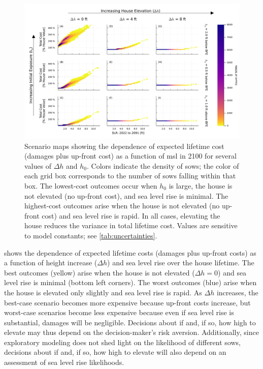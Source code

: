 \documentclass[12pt]{article}
\begin{document}
\begin{figure}
    \includegraphics[width=\textwidth]{scenario-map-slr-cost}
    \caption{
        Scenario maps showing the dependence of expected lifetime cost (damages plus up-front cost) as a function of \gls{msl} in 2100 for several values of $\Delta h$ and $h_0$.
        Colors indicate the density of \glspl{sow}; the color of each grid box corresponds to the number of \glspl{sow} falling within that box.
        The lowest-cost outcomes occur when $h_0$ is large, the house is not elevated (no up-front cost), and sea level rise is minimal.
        The highest-cost outcomes arise when the house is not elevated (no up-front cost) and sea level rise is rapid.
        In all cases, elevating the house reduces the variance in total lifetime cost.
        Values are sensitive to model constants; see \cref{tab:uncertainties}.
    }\label{fig:scenario-map-slr-cost}
\end{figure}

 shows the dependence of expected lifetime costs (damages plus up-front costs) as a function of height increase ($\Delta h$) and sea level rise over the house lifetime.
The best outcomes (yellow) arise when the house is not elevated ($\Delta h = 0$) and sea level rise is minimal (bottom left corners).
The worst outcomes (blue) arise when the house is elevated only slightly and sea level rise is rapid.
As $\Delta h$ increases, the best-case scenario becomes more expensive because up-front costs increase, but worst-case scenarios become less expensive because even if sea level rise is substantial, damages will be negligible.
Decisions about if and, if so, how high to elevate may thus depend on the decision-maker's risk aversion.
Additionally, since exploratory modeling does not shed light on the likelihood of different \glspl{sow}, decisions about if and, if so, how high to elevate will also depend on an assessment of sea level rise likelihoods.
\end{document}
